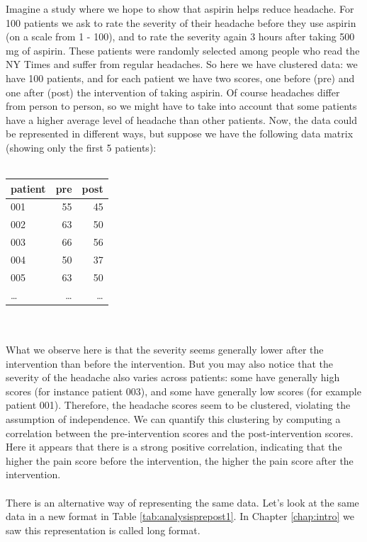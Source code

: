 \documentclass[]{report}\usepackage[]{graphicx}\usepackage[]{color}
\begin{document}
Imagine a study where we hope to show that aspirin helps reduce headache. For 100 patients we ask to rate the severity of their headache before they use aspirin (on a scale from 1 - 100), and to rate the severity again 3 hours after taking 500 mg of aspirin. These patients were randomly selected among people who read the NY Times and suffer from regular headaches. So here we have clustered data: we have 100 patients, and for each patient we have two scores, one before (pre) and one after (post) the intervention of taking aspirin. Of course headaches differ from person to person, so we might have to take into account that some patients have a higher average level of headache than other patients. Now, the data could be represented in different ways, but suppose we have the following data matrix (showing only the first 5 patients):
 \\
 \\
 \begin{tabular}{lrr}
 patient & pre & post \\ \hline
 001 & 55 & 45 \\
 002 & 63 & 50 \\
 003 & 66 & 56 \\
 004 & 50 & 37 \\
 005 & 63 & 50 \\
 \dots & \dots & \dots \\
 \end{tabular}
\\
\\
What we observe here is that the severity seems generally lower after the intervention than before the intervention. But you may also notice that the severity of the headache also varies across patients: some have generally high scores (for instance patient 003), and some have generally low scores (for example patient 001). Therefore, the headache scores seem to be clustered, violating the assumption of independence. We can quantify this clustering by computing a correlation between the pre-intervention scores and the post-intervention scores. Here it appears that there is a strong positive correlation, indicating that the higher the pain score before the intervention, the higher the pain score after the intervention. 
\\
\\

There is an alternative way of representing the same data. Let's look at the same data in a new format in Table \ref{tab:analysisprepost1}. In Chapter \ref{chap:intro} we saw this representation is called long format.
\end{document}
